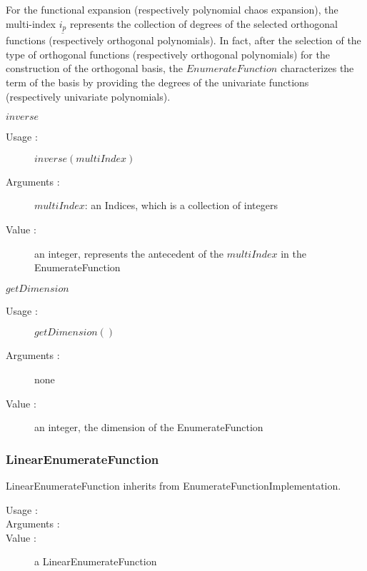 For the functional expansion (respectively polynomial chaos expansion), the multi-index $\underline{i_p}$ represents the collection of degrees of the selected orthogonal functions (respectively orthogonal polynomials). In fact, after the selection of the type of orthogonal functions (respectively orthogonal polynomials) for the construction of the orthogonal basis, the $EnumerateFunction$ characterizes the term of the basis by providing the degrees of the univariate functions (respectively univariate polynomials).
\begin{description}
    \bigskip
  \item $inverse$
    \begin{description}
    \item[Usage :] $inverse(multiIndex)$
    \item[Arguments :] $multiIndex$: an Indices, which is a collection of integers
    \item[Value :]  an integer, represents the antecedent of the $multiIndex$ in the EnumerateFunction
    \end{description}

    \bigskip
  \item $getDimension$
    \begin{description}
    \item[Usage :] $getDimension()$
    \item[Arguments :] none
    \item[Value :] an integer, the dimension of the EnumerateFunction
    \end{description}

\end{description}


\newpage \subsubsection{LinearEnumerateFunction}

         LinearEnumerateFunction inherits from EnumerateFunctionImplementation.

         \begin{description}
         \item[Usage :] \strut

         \item[Arguments :]  \strut

         \item[Value :] a LinearEnumerateFunction

         \end{description}

